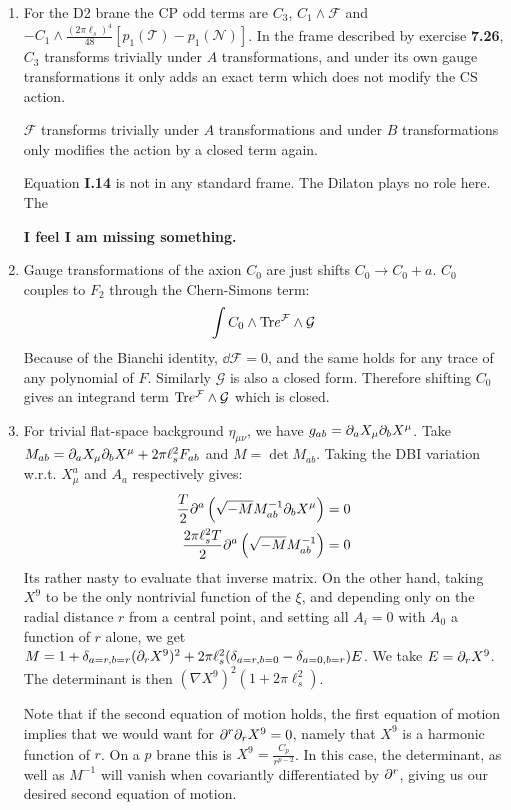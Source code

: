 \documentclass[11pt, class=article, crop=false]{standalone}
\begin{document}
\begin{enumerate}
	\item For the D2 brane the CP odd terms are $C_3$, $C_1 \wedge \mathcal F$ and $-C_1 \wedge \frac{(2\pi \ell_s)^4}{48} [p_1(\mathcal T) - p_1(\mathcal N)]$. In the frame described by exercise \textbf{7.26}, $C_3$ transforms trivially under $A$ transformations, and under its own gauge transformations it only adds an exact term which does not modify the CS action. 
	
	$\mathcal F$ transforms trivially under $A$ transformations and under $B$ transformations only modifies the action by a closed term again. 
	
	Equation \textbf{I.14} is not in any standard frame. The Dilaton plays no role here. The 
	
	\textbf{I feel I am missing something.}
	
	\item Gauge transformations of the axion $C_0$ are just shifts $C_0 \to C_0 + a$. $C_0$ couples to $F_2$ through the Chern-Simons term:
	\[
		\int C_0 \wedge \mathrm{Tr} e^{\mathcal F} \wedge \mathcal G
	\]
	Because of the Bianchi identity, $\dd \mathcal F = 0$, and the same holds for any trace of any polynomial of $F$. Similarly $\mathcal G$ is also a closed form. Therefore shifting $C_0$ gives an integrand term $\mathrm{Tr} e^{\mathcal F} \wedge \mathcal G$ which is closed.
	
	\item For trivial flat-space background $\eta_{\mu \nu}$, we have $g_{ab} = \partial_a X_\mu \partial_b X^\mu$. Take $M_{ab} = \partial_a X_\mu \partial_b X^\mu +  2\pi \ell_s^2 F_{ab}$ and $M = \det M_{ab}$. Taking the DBI variation w.r.t. $X_\mu^a$ and $A_a$ respectively gives:
	\[
	\begin{aligned}
		\frac{T}{2} \partial^a \left( \sqrt{-M} M^{-1}_{ab} \partial_b X^\mu \right) = 0\\
		 \frac{2 \pi \ell_s^2 T}{2} \partial^a \left(\sqrt{-M} M^{-1}_{ab} \right) = 0
	\end{aligned}
	\]
	Its rather nasty to evaluate that inverse matrix. On the other hand, taking $X^9$ to be the only nontrivial function of the $\xi$, and depending only on the radial distance $r$ from a central point, and setting all $A_i = 0$ with $A_0$ a function of $r$ alone, we get $M = 1 + \delta_{a=r, b=r} (\partial_r X^9)^2 + 2 \pi \ell_s^2 (\delta_{a=r, b=0} - \delta_{a=0, b=r}) E$. We take $E = \partial_r X^9$. The determinant is then $(\nabla X^9)^2 (1 + 2\pi \ell_s^2)$. 
	
	Note that if the second equation of motion holds, the first equation of motion implies that  we would want for $\partial^r \partial_r X^9 = 0$, namely that $X^9$ is a harmonic function of $r$. On a $p$ brane this is $X^9 = \frac{C_p}{r^{p-2}}$. In this case, the determinant, as well as $M^{-1}$ will vanish when covariantly differentiated by $\partial^r$, giving us our desired second equation of motion. 
	

\end{enumerate}
\end{document}
